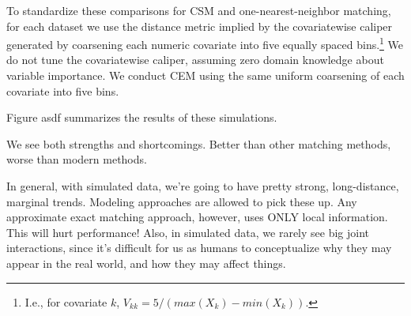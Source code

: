 \documentclass{article}
\begin{document}
To standardize these comparisons for CSM and one-nearest-neighbor matching, for each dataset we use the distance metric implied by the covariatewise caliper generated by coarsening each numeric covariate into five equally spaced bins.\footnote{I.e., for covariate $k$, $V_{kk} = 5 / (max(X_k) - min(X_k))$.}
We do not tune the covariatewise caliper, assuming zero domain knowledge about variable importance.
We conduct CEM using the same uniform coarsening of each covariate into five bins.

Figure asdf summarizes the results of these simulations.


We see both strengths and shortcomings.
Better than other matching methods, worse than modern methods.

In general, with simulated data, we're going to have pretty strong, long-distance, marginal trends.
Modeling approaches are allowed to pick these up.
Any approximate exact matching approach, however, uses ONLY local information.
This will hurt performance!
Also, in simulated data, we rarely see big joint interactions, since it's difficult for us as humans to conceptualize why they may appear in the real world, and how they may affect things.






\end{document}
